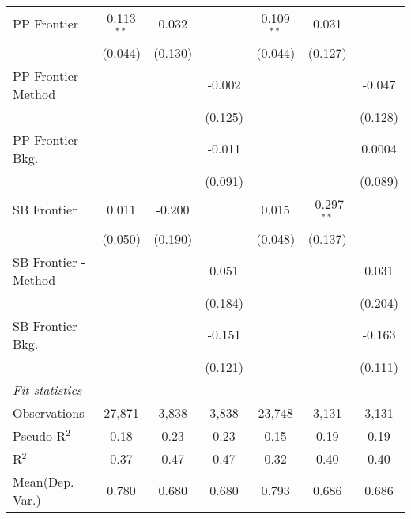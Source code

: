 \begin{tabular}{lcccccc}
   PP Frontier          & 0.113$^{**}$  & 0.032         &                & 0.109$^{**}$   & 0.031         &   \\   
                        & (0.044)       & (0.130)       &                & (0.044)        & (0.127)       &   \\   
   PP Frontier - Method &               &               & -0.002         &                &               & -0.047\\   
                        &               &               & (0.125)        &                &               & (0.128)\\   
   PP Frontier - Bkg.   &               &               & -0.011         &                &               & 0.0004\\   
                        &               &               & (0.091)        &                &               & (0.089)\\   
   SB Frontier          & 0.011         & -0.200        &                & 0.015          & -0.297$^{**}$ &   \\   
                        & (0.050)       & (0.190)       &                & (0.048)        & (0.137)       &   \\   
   SB Frontier - Method &               &               & 0.051          &                &               & 0.031\\   
                        &               &               & (0.184)        &                &               & (0.204)\\   
   SB Frontier - Bkg.   &               &               & -0.151         &                &               & -0.163\\   
                        &               &               & (0.121)        &                &               & (0.111)\\   
   \midrule
   \emph{Fit statistics}\\
   Observations         & 27,871        & 3,838         & 3,838          & 23,748         & 3,131         & 3,131\\  
   Pseudo R$^2$         & 0.18          & 0.23          & 0.23           & 0.15           & 0.19          & 0.19\\  
   R$^2$                & 0.37          & 0.47          & 0.47           & 0.32           & 0.40          & 0.40\\  
Mean(Dep. Var.) & 0.780 & 0.680 & 0.680 & 0.793 & 0.686 & 0.686 \\
   

\end{tabular}
